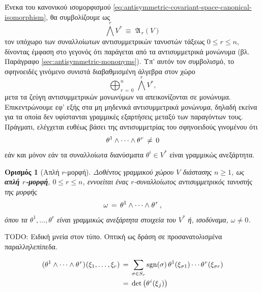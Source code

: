 \documentclass[11pt,a4paper,twoside,openright]{book}
\newtheorem{definition}[lemma]{Ορισμός}
\begin{document}
Ένεκα του κανονικού ισομορφισμού \eqref{eq:antisymmetric-covariant-space-canonical-isomorphism}, θα συμβολίζουμε ως
\begin{equation}
\bigwedge^{r} V^*
\,\equiv\,\,
\mathfrak{A}_{\,r}(V)
\end{equation}
τον υπόχωρο των συναλλοίωτων αντισυμμετρικών τανυστών τάξεως $0 \le r \le n$, δίνοντας έμφαση στο γεγονός ότι παράγεται από τα αντισυμμετρικά
μονώνυμα (βλ. Παράγραφο \ref{sec:antisymmetric-mononyms}).
Υπ' αυτόν τον συμβολισμό, το σφηνοειδές γινόμενο συνιστά διαβαθμισμένη άλγεβρα στον χώρο
\begin{equation}
\bigoplus_{r \,=\, 0}^n\,\bigwedge^r V^*,
\end{equation}
μετα τα ζεύγη αντισυμμετρικών μονωνύμων
να απεικονίζονται σε μονώνυμα. Επικεντρώνουμε εφ' εξής
στα μη μηδενικά αντισυμμετρικά μονώνυμα, δηλαδή εκείνα για τα οποία δεν υφίστανται γραμμικές εξαρτήσεις μεταξύ των παραγόντων τους.
Πράγματι, ελέγχεται ευθέως βάσει της αντισυμμετρίας του σφηνοειδούς γινομένου ότι
\begin{equation*}
\theta^1 \wedge \dots \wedge \theta^{\hspace{.5pt}r}\,\neq\,0
\end{equation*}
εάν και μόνον εάν τα συναλλοίωτα διανύσματα $\theta^i \in V^*$
είναι γραμμικώς ανεξάρτητα. 
\begin{definition}[Απλή $r$-μορφή]
	\label{def:simple-form}
Δοθέντος γραμμικού χώρου $V$ διάστασης $n \ge 1$, ως
\textbf{απλή $r$-μορφή}, $0 \le r \le n$, εννοείται ένας $r$-συναλλοίωτος αντισυμμετρικός τανυστής της μορφής
\begin{equation}\label{eq:simple-form}
\omega
\,=\,
\theta^1 \wedge \cdots \wedge \hspace{.5pt}\theta^{\hspace{.5pt}r}\,,
\end{equation}
όπου τα $\theta^1, \dots, \theta^r$ είναι γραμμικώς ανεξάρτητα στοιχεία του $V^*$ ή, ισοδύναμα, $\omega \neq 0$.
\end{definition}

TODO: Ειδική μνεία στον τύπο. Οπτική ως δράση σε προσανατολισμένα παραλληλεπίπεδα.

\begin{equation}\label{eq:covariant-mononym-evaluation}
\begin{split}
(\theta^1 \wedge \dots \wedge \theta^{\hspace{.5pt}r})\hspace{.5pt}(\xi_1, \dots, \xi_r)
\,&=\,
\sum_{\sigma \in S_r}
\operatorname{sgn}(\sigma)
\,
\theta^1(\xi_{\sigma 1}) \cdots \theta^{\hspace{.5pt}r}(\xi_{\sigma r})\\
\,&=\,
\det
\left(
	\theta^{\hspace{.5pt}i}(\xi_{\hspace{.5pt}j})
\right)
\end{split}
\end{equation}
\end{document}
